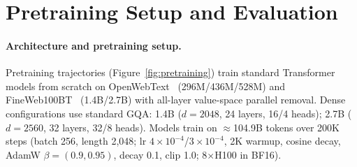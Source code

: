 \begin{table}[!t]
  \centering
  \scriptsize
  \caption{\textbf{Downstream controls for MLP-internal geometry.}
  Core-MC (9 tasks); MMLU (5-shot); GSM8K-S/F (strict/flex EM); TQA (Rouge-L); DROP/CoQA (F1). Collapsed runs marked `---'.}
  \label{tab:mlp-internal-downstream}
  \setlength{\tabcolsep}{2.5pt}
  \renewcommand{\arraystretch}{0.85}
  \vspace{-4pt}
\end{table}

\section{Pretraining Setup and Evaluation}
\label{app:training-configs}

\paragraph{Architecture and pretraining setup.}
Pretraining trajectories (Figure~\ref{fig:pretraining}) train standard Transformer models from scratch on OpenWebText~\citep{Gokaslan2019OpenWeb} (296M/436M/528M) and FineWeb100BT~\citep{penedo2024the} (1.4B/2.7B) with all-layer value-space parallel removal.
Dense configurations use standard GQA: 1.4B ($d=2048$, 24 layers, 16/4 heads); 2.7B ($d=2560$, 32 layers, 32/8 heads).
Models train on $\approx$104.9B tokens over 200K steps (batch 256, length 2,048; lr $4\times10^{-4}$/$3\times10^{-4}$, 2K warmup, cosine decay, AdamW $\beta=(0.9,0.95)$, decay 0.1, clip 1.0; 8$\times$H100 in BF16).


